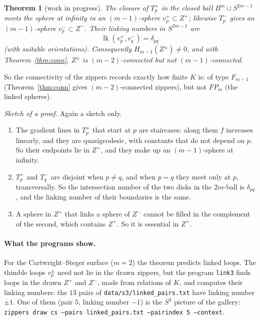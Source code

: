 \documentclass[11pt]{article}
\newtheorem{theorem}{Theorem}[section]
\theoremstyle{remark}
\newcommand{\lk}{\operatorname{lk}}
\begin{document}
\begin{theorem}[work in progress]\label{thm:link}
The closure of $T^+_p$ in the closed ball $B^m\cup S^{2m-1}$ meets the sphere at infinity in an $(m-1)$-sphere
$v^+_p\subset Z^+$; likewise $T^-_p$ gives an $(m-1)$-sphere $v^-_p\subset Z^-$. Their linking numbers in $S^{2m-1}$ are
\[
\lk(v^+_p,v^-_q)=\delta_{pq}
\]
(with suitable orientations). Consequently $H_{m-1}(Z^\pm)\neq0$, and with Theorem~\ref{thm:conn}, $Z^\pm$ is $(m-2)$-connected but not
$(m-1)$-connected.
\end{theorem}

So the connectivity of the zippers records exactly how finite $K$ is: of type $F_{m-1}$ (Theorem~\ref{thm:conn} gives
$(m-2)$-connected zippers), but not $FP_m$ (the linked spheres).

\noindent\emph{Sketch of a proof.} Again a sketch only.
\begin{enumerate}
\item The gradient lines in $T^+_p$ that start at $p$ are staircases: along them $f$ increases linearly, and they are
quasigeodesic, with constants that do not depend on $p$. So their endpoints lie in $Z^+$, and they make up an
$(m-1)$-sphere at infinity.
\item $T^+_p$ and $T^-_q$ are disjoint when $p\ne q$, and when $p=q$ they meet only at $p$, transversally. So the
intersection number of the two disks in the $2m$-ball is $\delta_{pq}$, and the linking number of their boundaries is the
same.
\item A sphere in $Z^+$ that links a sphere of $Z^-$ cannot be filled in the complement of the second, which contains
$Z^+$. So it is essential in $Z^+$.
\end{enumerate}

\paragraph{What the programs show.} For the Cartwright--Steger surface ($m=2$) the theorem predicts linked loops. The
thimble loops $v^\pm_p$ need not lie in the drawn zippers, but the program \texttt{link3} finds loops in the drawn $Z^+$ and
$Z^-$, made from relations of $K$, and computes their linking numbers: the $13$ pairs of \texttt{data/s3/linked\_pairs.txt}
have linking number $\pm1$. One of them (pair $5$, linking number $-1$) is the $S^3$ picture of the gallery:
\texttt{zippers draw cs --pairs linked\_pairs.txt --pairindex 5 --context}.
\end{document}
